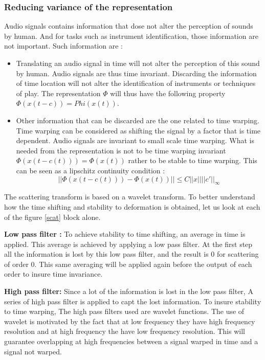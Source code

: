 \documentclass[hidelinks,12pt]{report}
\begin{document}
\subsubsection{Reducing variance of the representation}
Audio signals contains information that dose not alter the perception of sounds by human. And for tasks such as instrument identification, those information are not important. Such information are : 
\begin{itemize}
\item Translating an audio signal in time will not alter the perception of this sound by human. Audio signals are thus time invariant. Discarding the information of time location will not alter the identification of instruments or techniques of play. The representation $\Phi$ will thus have the following property $\Phi(x(t-c))=Phi(x(t))$.
\item Other information that can be discarded are the one related to time warping. Time warping can be considered as shifting the signal by a factor that is time dependent. Audio signals are invariant to small scale time warping. What is needed from the representation is not to be time warping invariant $\Phi (x(t-c(t)))=\Phi(x(t))$ rather to be stable to time warping. This can be seen as a lipschitz continuity condition : $$||\Phi (x(t-c(t)))-\Phi(x(t))|| \leq C||x||||c'||_{\infty}$$
\end{itemize}
The scattering transform is based on a wavelet transform. To better understand how the time shifting and stability to deformation is obtained, let us look at each of the figure \ref{scat} block alone.\par
\textbf{Low pass filter :}
To achieve stability to time shifting, an average in time is applied. This average is achieved by applying a low pass filter. At the first step all the information is lost by this low pass filter, and the result is 0 for scattering of order 0. This same averaging will be applied again before the output of each order to insure time invariance.\par
\textbf{High pass filter:}
Since a lot of the information is lost in the low pass filter, A series of high pass filter is applied to capt the lost information. To insure stability to time warping, The high pass filters used are wavelet functions. The use of wavelet is motivated by the fact that at low frequency they have high frequency resolution and at high frequency the have low frequency resolution. This will guarantee overlapping at high frequencies between a signal warped in time and a signal not warped.\par
\end{document}
